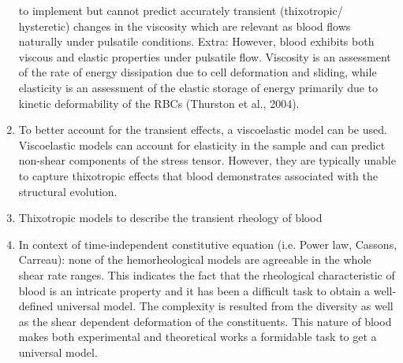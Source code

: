 \documentclass[11pt,letterpaper]{article}
\begin{document}
\begin{enumerate}
to implement but cannot predict accurately transient (thixotropic/
hysteretic) changes in the viscosity which are relevant as blood
flows naturally under pulsatile conditions. Extra: However,  blood exhibits both viscous and elastic  properties under pulsatile flow. Viscosity 
is  an  assessment  of the rate of energy dissipation due to cell 
deformation and sliding, while elasticity is an assessment of  the elastic  storage of  energy  primarily due to kinetic deformability of the RBCs (Thurston  et al., 2004). 
\item To better account for
the transient effects, a viscoelastic model can be used. 
Viscoelastic models can account for elasticity in the sample
and can predict non-shear components of the stress tensor. However, they are typically unable to capture thixotropic effects that
blood demonstrates associated with the structural evolution.
\item Thixotropic models to
describe the transient rheology of blood
\item In context of time-independent constitutive equation (i.e. Power law, Cassons, Carreau): none of the hemorheological models are agreeable in the whole shear rate ranges. This indicates the fact that the rheological characteristic of blood is an intricate property and it has been a difficult task to obtain a well-defined universal model. The complexity is resulted from the diversity as well as the shear dependent deformation of the constituents. This nature of blood makes both experimental and theoretical works a formidable task to get a universal model.
\end{enumerate}


\newpage
\end{document}
